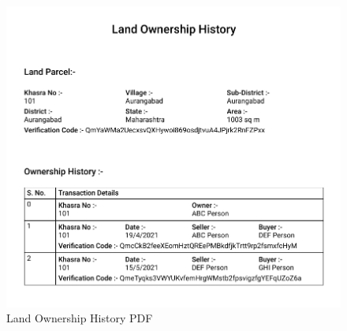 \documentclass[12pt]{article}
\begin{document}
        \begin{figure}[H]
                \includegraphics[scale=0.5, frame]{landRecord.png}
                \centering
                \caption{Land Ownership History PDF}
                \label{fig:pdfreport}
        \end{figure}
        
\end{document}

